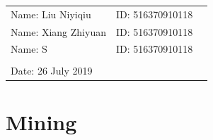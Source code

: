 \documentclass[12pt,a4paper]{article}
\begin{document}
\vspace*{0.25cm}

\hrulefill

\thispagestyle{empty}

\begin{center}
\begin{large}
\end{large}

\hrulefill

\vspace*{5cm}
\begin{Large}
\end{Large}

\vspace{2em}

\begin{large}
\end{large}
\end{center}


\vfill

\begin{table}[h!]
\flushleft
\begin{tabular}{lll}
Name: Liu Niyiqiu \hspace*{2em}&
ID: 516370910118\hspace*{2em}
\\
Name: Xiang Zhiyuan \hspace*{2em}&
ID: 516370910118\hspace*{2em}
\\
Name: S \hspace*{2em}&
ID: 516370910118\hspace*{2em}
\\


\\

Date: 26 July 2019
\end{tabular}
\end{table}

\hfill

\newpage
\tableofcontents
\newpage

\section{Mining}
\end{document}

